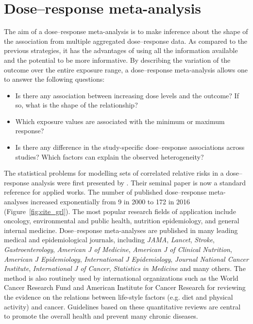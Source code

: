\documentclass[11pt,a4paper,twoside,openany]{book}\usepackage{knitr}
\begin{document}
{{\section{Dose--response meta-analysis}

The aim of a dose--response meta-analysis is to make inference about the shape of the association from multiple aggregated dose--response data. As compared to the previous strategies, it has the advantages of using all the information available and the potential to be more informative. By describing the variation of the outcome over the entire exposure range, a dose--response meta-analysis allows one to answer the following questions:
\begin{itemize}
\item Is there any association between increasing dose levels and the outcome? If so, what is the shape of the relationship?
\item Which exposure values are associated with the minimum or maximum response?
\item Is there any difference in the study-specific dose--response associations across studies? Which factors can explain the observed heterogeneity?
\end{itemize}

\noindent The statistical problems for modelling sets of correlated relative risks in a dose--response analysis were first presented by \cite{greenland1992methods}. Their seminal paper is now a standard reference for applied works. The number of published dose--response meta-analyses increased exponentially from 9 in 2000 to 172 in 2016 (Figure~\ref{fig:cite_grl}).
The most popular research fields of application include oncology, environmental and public health, nutrition epidemiology, and general internal medicine. Dose--response meta-analyses are published in many leading medical and epidemiological journals, including \textit{JAMA}, \textit{Lancet}, \textit{Stroke}, \textit{Gastroenterology}, \textit{American J of Medicine}, \textit{American J of Clinical Nutrition}, \textit{American J Epidemiology}, \textit{International J Epidemiology}, \textit{Journal National Cancer Institute}, \textit{International J of Cancer}, \textit{Statistics in Medicine} and many others. 
The method is also routinely used by international organizations such as the World Cancer Research Fund and American Institute for Cancer Research for reviewing the evidence on the relations between life-style factors (e.g. diet and physical activity) and cancer. Guidelines based on these quantitative reviews are central to promote the overall health and prevent many chronic diseases.

}}
\end{document}
